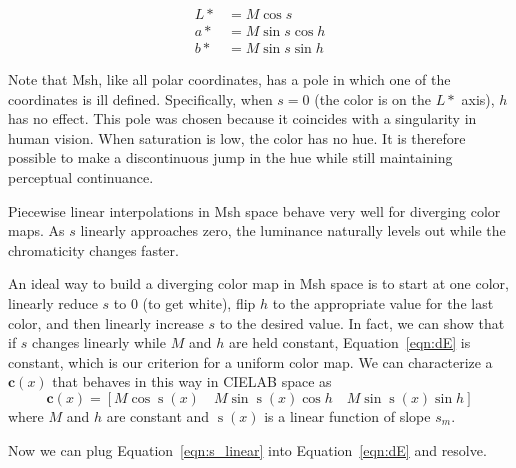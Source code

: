 \documentclass[review,journal]{vgtc}         %
\newcommand{\Lab}{CIELAB\xspace}
\newcommand{\Msh}{Msh\xspace}
\newcommand*{\cvec}[1]{\mathbf{#1}}
\begin{document}
\begin{equation}
  \begin{split}
    L* &= M \cos s \\
    a* &= M \sin s \cos h \\
    b* &= M \sin s \sin h
  \end{split}
  \label{eqn:MshToLab}
\end{equation}

Note that \Msh, like all polar coordinates, has a pole in which one of the
coordinates is ill defined.  Specifically, when $s = 0$ (the color is on
the $L*$ axis), $h$ has no effect.  This pole was chosen because it
coincides with a singularity in human vision.  When saturation is low, the
color has no hue.  It is therefore possible to make a discontinuous jump
in the hue while still maintaining perceptual continuance.

Piecewise linear interpolations in \Msh space behave very well for
diverging color maps.  As $s$ linearly approaches zero, the luminance
naturally levels out while the chromaticity changes faster.

An ideal way to build a diverging color map in \Msh space is to start at
one color, linearly reduce $s$ to 0 (to get white), flip $h$ to the
appropriate value for the last color, and then linearly increase $s$ to the
desired value.  In fact, we can show that if $s$ changes linearly while $M$
and $h$ are held constant, Equation~\ref{eqn:dE} is constant, which is our
criterion for a uniform color map.  We can characterize a $\cvec{c}(x)$ that
behaves in this way in \Lab space as
\begin{equation}
  \cvec{c}(x) = [ M \cos \operatorname{s}(x) \quad
  M \sin \operatorname{s}(x) \cos h \quad
  M \sin \operatorname{s}(x) \sin h ]
  \label{eqn:s_linear}
\end{equation}
where $M$ and $h$ are constant and $\operatorname{s}(x)$ is a linear
function of slope $s_m$.

Now we can plug Equation~\ref{eqn:s_linear} into Equation~\ref{eqn:dE} and
resolve.
\end{document}

